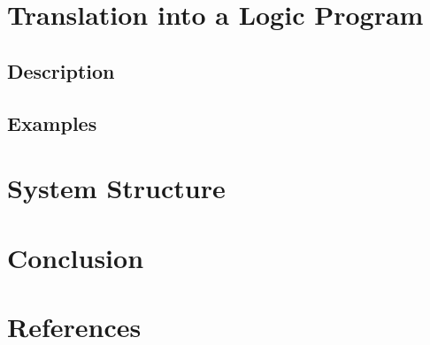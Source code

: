 \documentclass[a4paper]{article}
\begin{document}
  \section{Translation into a Logic Program}

    \subsection{Description}

    \subsection{Examples}

    \pagebreak

  \section{System Structure}

    \pagebreak

  \section{Conclusion}

    \pagebreak

  \section{References}
\end{document}
